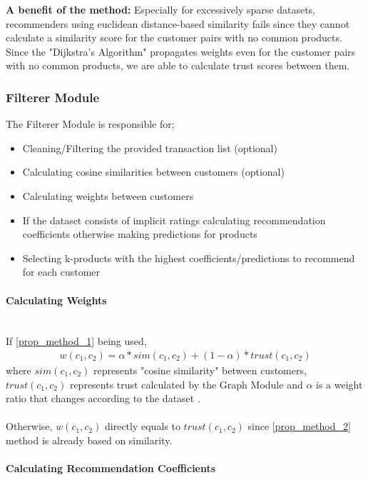 	\textbf{A benefit of the method:} Especially for excessively sparse datasets, recommenders using euclidean distance-based similarity fails since they cannot calculate a similarity score for the customer pairs with no common products.	Since the  "Dijkstra's Algorithm" propagates weights even for the customer pairs with no common products, we are able to calculate trust scores between them.
	
	\subsubsection{Filterer Module} The Filterer Module is responsible for;
	\begin{itemize}
	\item Cleaning/Filtering the provided transaction list (optional)
	\item Calculating cosine similarities between customers (optional)
	\item Calculating weights between customers
	\item If the dataset consists of implicit ratings calculating recommendation coefficients otherwise making predictions for products
	\item Selecting k-products with the highest coefficients/predictions to recommend for each customer
	\end{itemize}

	\paragraph{Calculating Weights} \mbox{}\\
	If \ref{prop_method_1} being used,
	\begin{equation*} 
	\begin{split}
		w(c_{1}, c_{2}) = \alpha*sim(c_{1},c_{2})+(1-\alpha)*trust(c_{1},c_{2})
	\end{split}
	\end{equation*}
	where $sim(c_{1},c_{2})$ represents "cosine similarity" between customers, $trust(c_{1},c_{2})$ represents trust calculated by the Graph Module and $\alpha$ is a weight ratio that changes according to the dataset .\\ \\
	Otherwise, $w(c_{1}, c_{2})$ directly equals to $trust(c_{1},c_{2})$ since \ref{prop_method_2} method is already based on similarity.

	\paragraph{Calculating Recommendation Coefficients}

